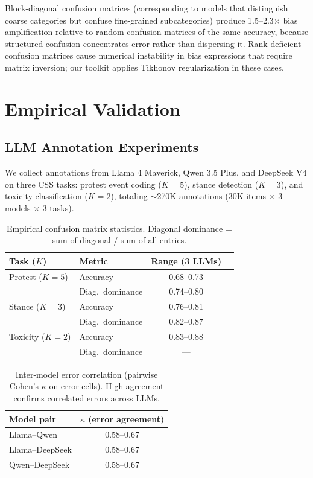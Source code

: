 \documentclass[11pt]{article}
\begin{document}
Block-diagonal confusion matrices (corresponding to models that distinguish coarse categories but confuse fine-grained subcategories) produce 1.5--2.3$\times$ bias amplification relative to random confusion matrices of the same accuracy, because structured confusion concentrates error rather than dispersing it.
Rank-deficient confusion matrices cause numerical instability in bias expressions that require matrix inversion; our toolkit applies Tikhonov regularization in these cases.

\section{Empirical Validation}\label{sec:empirical}

\subsection{LLM Annotation Experiments}

We collect annotations from Llama 4 Maverick, Qwen 3.5 Plus, and DeepSeek V4 on three CSS tasks: protest event coding ($K=5$), stance detection ($K=3$), and toxicity classification ($K=2$), totaling $\sim$270K annotations (30K items $\times$ 3 models $\times$ 3 tasks).

\begin{table}[t]
\centering
\caption{Empirical confusion matrix statistics. Diagonal dominance = sum of diagonal / sum of all entries.}
\label{tab:empirical-cm}
\small
\begin{tabular}{llcc}
\toprule
Task ($K$) & Metric & Range (3 LLMs) \\
\midrule
Protest ($K\!=\!5$) & Accuracy & 0.68--0.73 \\
& Diag.\ dominance & 0.74--0.80 \\
\midrule
Stance ($K\!=\!3$) & Accuracy & 0.76--0.81 \\
& Diag.\ dominance & 0.82--0.87 \\
\midrule
Toxicity ($K\!=\!2$) & Accuracy & 0.83--0.88 \\
& Diag.\ dominance & --- \\
\bottomrule
\end{tabular}
\end{table}

\begin{table}[t]
\centering
\caption{Inter-model error correlation (pairwise Cohen's $\kappa$ on error cells). High agreement confirms correlated errors across LLMs.}
\label{tab:inter-model}
\small
\begin{tabular}{lc}
\toprule
Model pair & $\kappa$ (error agreement) \\
\midrule
Llama--Qwen & 0.58--0.67 \\
Llama--DeepSeek & 0.58--0.67 \\
Qwen--DeepSeek & 0.58--0.67 \\
\bottomrule
\end{tabular}
\end{table}
\end{document}
